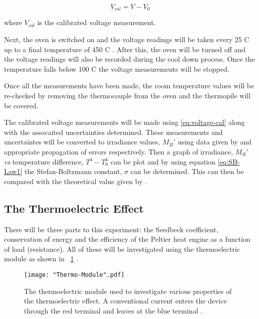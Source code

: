 \documentclass{article}
\newcommand{\figref}[2][\figurename~]{#1\ref{#2}}
\begin{document}
\begin{equation}
\label{eq:voltage-cal}
V_{cal} = V - V_0
\end{equation}

\vspace{2mm}
\noindent
where $V_{cal}$ is the calibrated voltage measurement. 

\vspace{2mm}
\noindent
Next, the oven is switched on and the voltage readings will be taken every 25 C up to a final temperature of 450 C \cite{Paper01}. After this, the oven will be turned off and the voltage readings will also be recorded during the cool down process. Once the temperature falls below 100 C \cite{Paper01} the voltage measurements will be stopped.

\vspace{2mm}
\noindent
Once all the measurements have been made, the room temperature values will be re-checked by removing the thermocouple from the oven and the thermopile will be covered.

\vspace{2mm}
\noindent
The calibrated voltage measurements will be made using \eqref{eq:voltage-cal} along with the assocaited uncertainties determined. These measurements and uncertaintes will be converted to irradiance values, $M_B'$ using data given by \cite{Paper01} and appropriate propagation of errors respectively. Then a graph of irradiance, $M_B'$ \textit{vs} temperature difference, $T^4 - T_0^4$ can be plot and by using equation \eqref{eq:SB-Law1} the Stefan-Boltzmann constant, $\sigma$ can be determined. This can then be compared with the theoretical value given by \cite{Paper01}.

\subsection{The Thermoelectric Effect}
\label{ssec:thermoelectric-method}

There will be three parts to this experiment: the Seedbeck coefficient, conservation of energy and the efficiency of the Peltier heat engine as a function of load (resistance). All of these will be investigated using the thermoelectric module as shown in \figref{fig:Thermo-Module} \cite{Paper02}. 

\begin{figure}[h]
\centering
\texttt{[image: "Thermo-Module".pdf]}
\caption{The thermoelectric module used to investigate various properties of the thermoelectric effect. A conventional current enters the device through the red terminal and leaves at the blue terminal \cite{Paper02}.}
\label{fig:Thermo-Module}
\end{figure}
\end{document}
